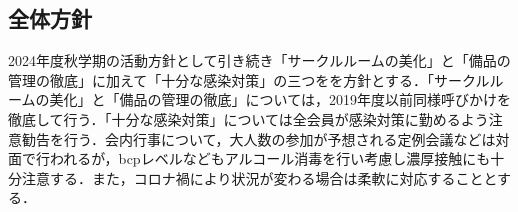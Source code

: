 \subsection*{全体方針}


2024年度秋学期の活動方針として引き続き「サークルルームの美化」と「備品の管理の徹底」に加えて「十分な感染対策」の三つをを方針とする．「サークルルームの美化」と「備品の管理の徹底」については，2019年度以前同様呼びかけを徹底して行う．「十分な感染対策」については全会員が感染対策に勤めるよう注意勧告を行う．会内行事について，大人数の参加が予想される定例会議などは対面で行われるが，bcpレベルなどもアルコール消毒を行い考慮し濃厚接触にも十分注意する．また，コロナ禍により状況が変わる場合は柔軟に対応することとする．
